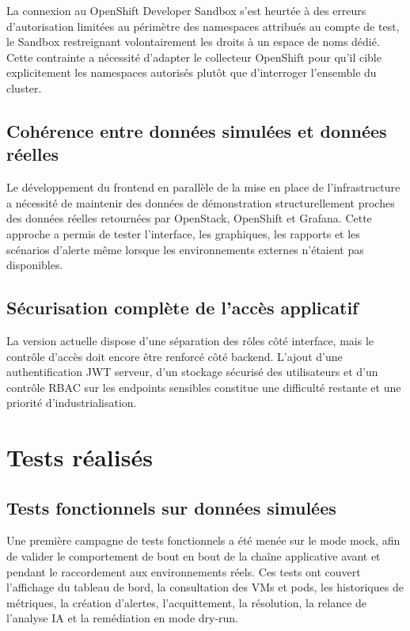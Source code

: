 \documentclass[11pt,a4paper]{report}
\begin{document}
La connexion au OpenShift Developer Sandbox s'est heurtée à des erreurs
d'autorisation limitées au périmètre des namespaces attribués au compte de
test, le Sandbox restreignant volontairement les droits à un espace de noms
dédié. Cette contrainte a nécessité d'adapter le collecteur OpenShift pour
qu'il cible explicitement les namespaces autorisés plutôt que d'interroger
l'ensemble du cluster.

\subsection{Cohérence entre données simulées et données réelles}

Le développement du frontend en parallèle de la mise en place de
l'infrastructure a nécessité de maintenir des données de démonstration
structurellement proches des données réelles retournées par OpenStack,
OpenShift et Grafana. Cette approche a permis de tester l'interface, les
graphiques, les rapports et les scénarios d'alerte même lorsque les
environnements externes n'étaient pas disponibles.

\subsection{Sécurisation complète de l'accès applicatif}

La version actuelle dispose d'une séparation des rôles côté interface, mais le
contrôle d'accès doit encore être renforcé côté backend. L'ajout d'une
authentification JWT serveur, d'un stockage sécurisé des utilisateurs et d'un
contrôle RBAC sur les endpoints sensibles constitue une difficulté restante et
une priorité d'industrialisation.

\section{Tests réalisés}

\subsection{Tests fonctionnels sur données simulées}

Une première campagne de tests fonctionnels a été menée sur le
mode mock, afin de valider le comportement de bout en bout de la chaîne
applicative avant et pendant le raccordement aux environnements réels. Ces
tests ont couvert l'affichage du tableau de bord, la consultation des VMs et
pods, les historiques de métriques, la création d'alertes, l'acquittement, la
résolution, la relance de l'analyse IA et la remédiation en mode dry-run.
\end{document}
